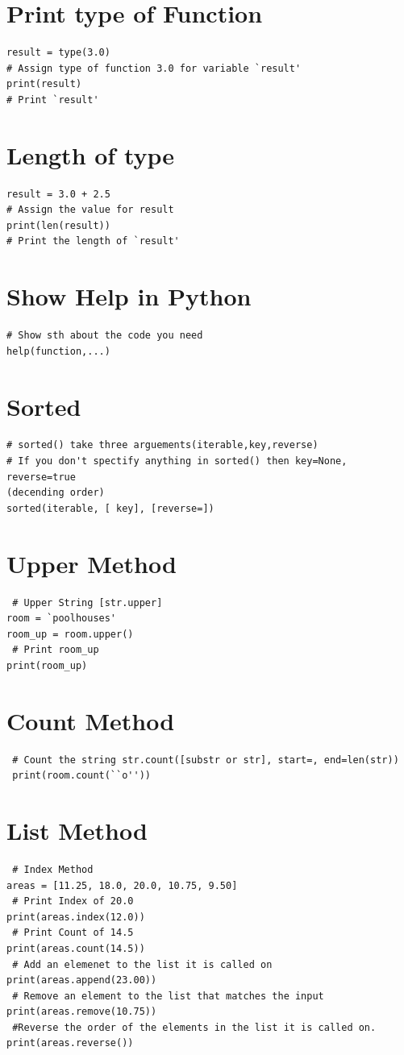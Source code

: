 \documentclass[12pt]{article}
\begin{document}
\section{Print type of Function}
\begin{lstlisting}
result = type(3.0)
# Assign type of function 3.0 for variable `result'
print(result)
# Print `result'
\end{lstlisting}
\pagebreak
\section{Length of type}
\begin{lstlisting}[frame=single]
result = 3.0 + 2.5
# Assign the value for result
print(len(result))
# Print the length of `result'
\end{lstlisting}
\section{Show Help in Python}
\begin{lstlisting}
# Show sth about the code you need
help(function,...)
\end{lstlisting}
\section{Sorted}
\begin{lstlisting}
# sorted() take three arguements(iterable,key,reverse)
# If you don't spectify anything in sorted() then key=None, reverse=true
(decending order)
sorted(iterable, [ key], [reverse=])
\end{lstlisting}
\section{Upper Method}
\begin{lstlisting}
 # Upper String [str.upper]
room = `poolhouses'
room_up = room.upper()
 # Print room_up
print(room_up)
\end{lstlisting}
\section{Count Method}
\begin{lstlisting}
 # Count the string str.count([substr or str], start=, end=len(str))
 print(room.count(``o''))
\end{lstlisting}
\section{List Method}
\begin{lstlisting}
 # Index Method
areas = [11.25, 18.0, 20.0, 10.75, 9.50]
 # Print Index of 20.0
print(areas.index(12.0))
 # Print Count of 14.5
print(areas.count(14.5))
 # Add an elemenet to the list it is called on
print(areas.append(23.00))
 # Remove an element to the list that matches the input
print(areas.remove(10.75))
 #Reverse the order of the elements in the list it is called on.
print(areas.reverse())
\end{lstlisting}
\end{document}
